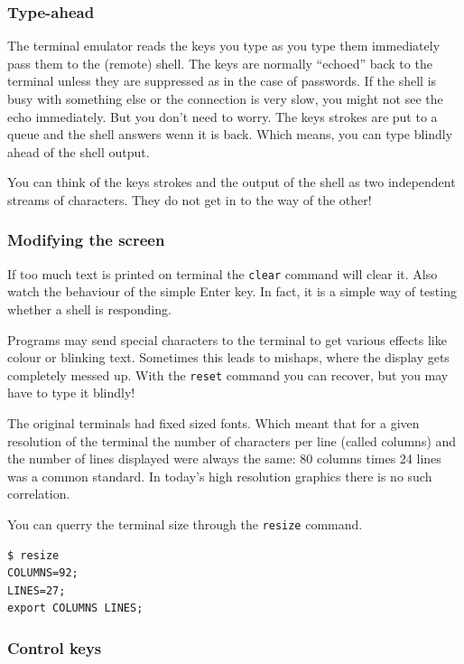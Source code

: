 \documentclass[11pt,a4paper,twoside]{article}
\begin{document}
\subsubsection{Type-ahead}

The terminal emulator reads the keys you type as you type them immediately
pass them to the (remote) shell. The keys are normally ``echoed'' back to 
the terminal unless they are suppressed as in the case of passwords. If the 
shell is busy with something else or the connection is very slow, you might 
not see the echo immediately. But you don't need to worry. The keys strokes
are put to a queue and the shell answers wenn it is back. Which means, you 
can type blindly ahead of the shell output.

You can think of the keys strokes and the output of the shell as two 
independent streams of characters. They do not get in to the way of
the other!

\subsubsection{Modifying the screen}

If too much text is printed on terminal the \texttt{clear} command 
will clear it. Also watch the behaviour of the simple Enter key. In
fact, it is a simple way of testing whether a shell is responding.

Programs may send special characters to the terminal to get various
effects like colour or blinking text. Sometimes this leads to mishaps, 
where the display gets completely messed up. With the \texttt{reset} 
command you can recover, but you may have to type it blindly!

The original terminals had fixed sized fonts. Which meant that for a
given resolution of the terminal the number of characters per line 
(called columns) and the number of lines displayed were always the 
same: 80 columns times  24 lines was a common standard. In today's 
high resolution graphics there is no such correlation. 

You can querry the terminal size through the \texttt{resize} command.

\begin{lstlisting}[frame=single]
$ resize
COLUMNS=92;
LINES=27;
export COLUMNS LINES;
\end{lstlisting}


\subsubsection{Control keys}
\end{document}

